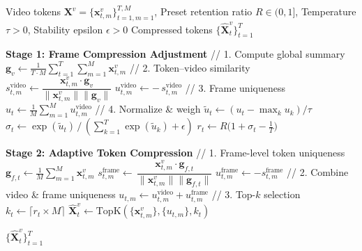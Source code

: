 \begin{algorithm}[t]
\caption{VidCom$^2$: Plug-and-Play Token Compression for VideoLLMs}
\label{alg:vidcom2}
\begin{algorithmic}[1]
\Require  
Video tokens $\mathbf{X}^v = \{\mathbf{x}_{t,m}^v\}_{t=1,m=1}^{T,M}$,  
Preset retention ratio $R\in(0,1]$,  
Temperature $\tau>0$,  
Stability epsilon $\epsilon>0$
\Ensure Compressed tokens $\{\hat{\mathbf{X}}_t^v\}_{t=1}^T$

\State \textbf{Stage 1: Frame Compression Adjustment}  
\State // 1. Compute global summary  
\State $\displaystyle \mathbf{g}_v \leftarrow \tfrac{1}{T\cdot M}\sum_{t=1}^T\sum_{m=1}^M \mathbf{x}_{t,m}^v$
\State // 2. Token–video similarity  
  \State $s^\mathrm{video}_{t,m}\leftarrow \dfrac{\mathbf{x}_{t,m}^v\cdot\mathbf{g}_v}{\|\mathbf{x}_{t,m}^v\|\|\mathbf{g}_v\|}$
  \State $u_{t,m}^\text{video}\leftarrow -\,s^\mathrm{video}_{t,m}$
\EndFor
    \State // 3. Frame uniqueness  
  \State $u_t\leftarrow \frac{1}{M}\sum_{m=1}^{M} u^\mathrm{video}_{t,m}$
\EndFor
    \State // 4. Normalize \& weigh  
  \State $\tilde u_t\leftarrow (u_t - \max_k u_k)/\tau$
  \State $\sigma_t\leftarrow \exp(\tilde u_t)\,/\,(\sum_{k=1}^T\exp(\tilde u_k)+\epsilon)$
  \State $r_t\leftarrow R\bigl(1 + \sigma_t - \tfrac1T\bigr)$  
\EndFor

\State \textbf{Stage 2: Adaptive Token Compression} 
  \State // 1. Frame-level token uniqueness  
  \State $\mathbf{g}_{f,t}\leftarrow \tfrac{1}{M}\sum_{m=1}^M \mathbf{x}_{t,m}^v$
    \State $s_{t,m}^\text{frame}\leftarrow \,\dfrac{\mathbf{x}_{t,m}^v\!\cdot\!\mathbf{g}_{f,t}}{\|\mathbf{x}_{t,m}^v\|\|\mathbf{g}_{f,t}\|}$
    \State $u_{t,m}^\text{frame} \leftarrow -s_{t,m}^\text{frame}$
  \EndFor
  \State // 2. Combine video \& frame uniqueness  
    \State $u_{t,m}\leftarrow u_{t,m}^\text{video} + u_{t,m}^\text{frame}$
  \EndFor
  \State // 3. Top-$k$ selection  
  \State $k_t\leftarrow \lceil r_t \times M\rceil$
  \State $\hat{\mathbf{X}}_t^v \leftarrow \text{TopK}(\{\mathbf{x}_{t,m}^v\}, \{u_{t,m}\}, k_t)$
\EndFor

\State \Return $\{\hat{\mathbf{X}}_t^v\}_{t=1}^T$
\end{algorithmic}
\end{algorithm}
